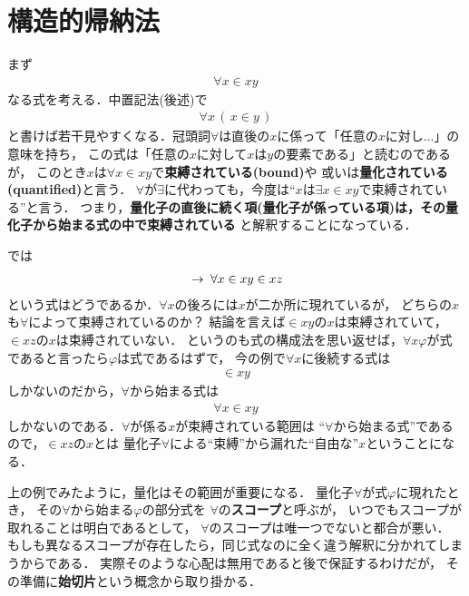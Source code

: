 \section{構造的帰納法}
	まず
	\begin{align}
		\forall x \in x y
	\end{align}
	なる式を考える．中置記法(後述)で
	\begin{align}
		\forall x\, (\, x \in y\, )
	\end{align}
	と書けば若干見やすくなる．冠頭詞$\forall$は直後の$x$に係って「任意の$x$に対し...」の意味を持ち，
	この式は「任意の$x$に対して$x$は$y$の要素である」と読むのであるが，
	このとき$x$は$\forall x \in x y$で{\bf 束縛されている}{\bf (bound)}や
	或いは{\bf 量化されている}{\bf (quantified)}と言う．
	$\forall$が$\exists$に代わっても，今度は``$x$は$\exists x \in x y$で束縛されている''と言う．
	つまり，{\bf 量化子の直後に続く項(量化子が係っている項)は，その量化子から始まる式の中で束縛されている}
	と解釈することになっている．
	
	では
	\begin{align}
		\hspace{0.25em}\rightarrow\hspace{0.25em} \forall x \in x y \in x z
	\end{align}
	という式はどうであるか．$\forall x$の後ろには$x$が二か所に現れているが，
	どちらの$x$も$\forall$によって束縛されているのか？
	結論を言えば$\in x y$の$x$は束縛されていて，$\in x z$の$x$は束縛されていない．
	というのも式の構成法を思い返せば，$\forall x \varphi$が式であると言ったら$\varphi$は式であるはずで，
	今の例で$\forall x$に後続する式は
	\begin{align}
		\in x y
	\end{align}
	しかないのだから，$\forall$から始まる式は
	\begin{align}
		\forall x \in x y
	\end{align}
	しかないのである．$\forall$が係る$x$が束縛されている範囲は
	``$\forall$から始まる式''であるので，$\in x z$の$x$とは
	量化子$\forall$による``束縛''から漏れた``自由な''$x$ということになる．
	
	上の例でみたように，量化はその範囲が重要になる．
	量化子$\forall$が式$\varphi$に現れたとき，
	その$\forall$から始まる$\varphi$の部分式を
	$\forall$の{\bf スコープ}と呼ぶが，
	いつでもスコープが取れることは明白であるとして，
	$\forall$のスコープは唯一つでないと都合が悪い．
	もしも異なるスコープが存在したら，同じ式なのに全く違う解釈に分かれてしまうからである．
	実際そのような心配は無用であると後で保証するわけだが，
	その準備に{\bf 始切片}という概念から取り掛かる．
	
